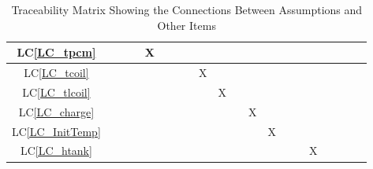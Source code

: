 \documentclass[12pt]{article}
\newcommand{\lcref}[1]{LC\ref{#1}}
\begin{document}
{\begin{landscape}
\begin{table}[h!]
\begin{tabular}{|c|c|c|c|c|c|c|c|c|c|c|c|c|c|c|c|c|c|c|c|}
\lcref{LC_tpcm}     & & & & X& & & & & & & & & & & & & & & \\ \hline
\lcref{LC_tcoil}    & & & & & & & & X& & & & & & & & & & & \\ \hline
\lcref{LC_tlcoil}   & & & & & & & & & X& & & & & & & & & & \\ \hline
\lcref{LC_charge}   & & & & & & & & & & & X& & & & & & & & \\ \hline
\lcref{LC_InitTemp} & & & & & & & & & & & & X& & & & & & & \\ \hline
\lcref{LC_htank}    & & & & & & & & & & & & & & & X& & & & \\
\hline
\end{tabular}
\caption{Traceability Matrix Showing the Connections Between Assumptions and Other Items}
\label{Table:A_trace}
\end{table}
\end{landscape}
}
\end{document}
